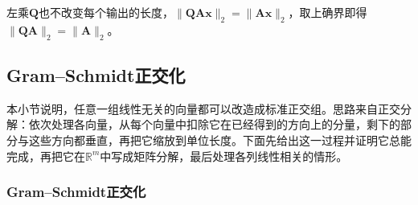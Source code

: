 左乘$\bm Q$也不改变每个输出的长度，$\lVert\bm Q\bm A\bm x\rVert_2=\lVert\bm A\bm x\rVert_2$，取上确界即得$\lVert\bm Q\bm A\rVert_2=\lVert\bm A\rVert_2$。

\subsection{Gram--Schmidt正交化}
\label{sec:ls-orthonormal-basis-construction}

本小节说明，任意一组线性无关的向量都可以改造成标准正交组。思路来自正交分解：依次处理各向量，从每个向量中扣除它在已经得到的方向上的分量，剩下的部分与这些方向都垂直，再把它缩放到单位长度。下面先给出这一过程并证明它总能完成，再把它在$\mathbb R^m$中写成矩阵分解，最后处理各列线性相关的情形。

\subsubsection{Gram--Schmidt正交化}

